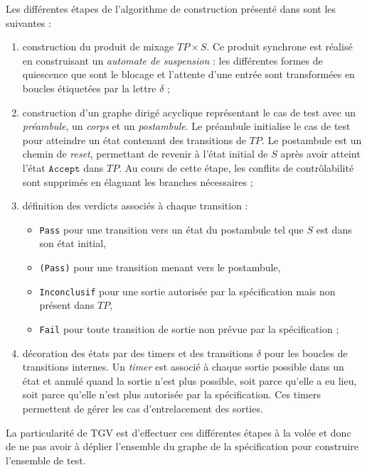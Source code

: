 Les diff\'erentes \'etapes de l'algorithme de construction
pr\'esent\'e dans \cite{tgv} sont les suivantes :
\begin{enumerate}
  \item construction du produit de mixage $TP\times{}S$. Ce produit
    synchrone est r\'ealis\'e en construisant un \emph{automate de
    suspension} : les diff\'erentes formes  de quiescence que sont le
    blocage et  l'attente d'une entr\'ee sont transform\'ees en boucles
    \'etiquet\'ees par la lettre $\delta$ ;
  \item construction d'un graphe dirig\'e acyclique repr\'esentant le cas de test avec un
    \emph{pr\'eambule}, un \emph{corps} et un \emph{postambule}. Le
    pr\'eambule initialise le cas de test pour atteindre un \'etat
    contenant des transitions de $TP$. Le postambule est  un chemin
    de \emph{reset}, permettant de revenir \`a l'\'etat initial de $S$
    apr\`es avoir atteint l'\'etat $\mathtt{Accept}$ dans $TP$. Au
    cours de cette \'etape, les conflits de contr\^olabilit\'e sont
    supprim\'es en \'elaguant les branches n\'ecessaires ;
  \item d\'efinition des verdicts associ\'es \`a chaque transition :
    \begin{itemize}
      \item \texttt{Pass} pour une transition vers un \'etat du postambule
        tel que $S$ est dans son \'etat initial,
      \item \texttt{(Pass)} pour une transition menant vers le
        postambule,
      \item \texttt{Inconclusif} pour une sortie autoris\'ee par la
        sp\'ecification mais non pr\'esent dans $TP$,
      \item \texttt{Fail} pour toute transition de sortie non pr\'evue par
        la sp\'ecification ;
    \end{itemize}
  \item d\'ecoration des \'etats par des timers et des transitions
    $\delta$ pour les boucles de transitions internes. Un \emph{timer} est associ\'e \`a
    chaque sortie possible dans un \'etat et annul\'e quand la sortie
    n'est plus possible, soit parce qu'elle a eu lieu, soit parce
    qu'elle n'est plus autoris\'ee  par la sp\'ecification. Ces timers
    permettent de g\'erer les cas  d'entrelacement des sorties.
\end{enumerate}
La particularit\'e de \textsf{TGV} est d'effectuer ces
diff\'erentes \'etapes \`a la vol\'ee et donc de ne pas avoir
\`a d\'eplier l'ensemble du graphe de la sp\'ecification  pour
construire l'ensemble de test. 

